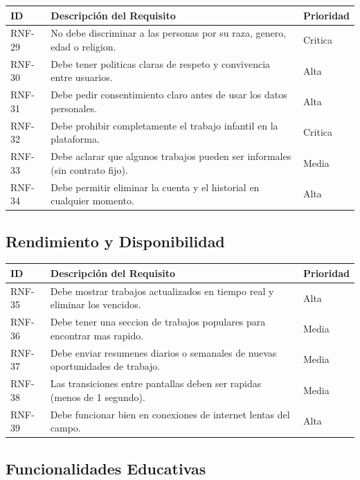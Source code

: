 \documentclass[12pt, a4paper]{article}
\begin{document}
\begin{longtable}{|p{2cm}|p{10cm}|p{2cm}|}
\hline
\textbf{ID} & \textbf{Descripción del Requisito} & \textbf{Prioridad} \\
\hline
\endhead

RNF-29 & No debe discriminar a las personas por su raza, genero, edad o religion. & Critica \\
\hline
RNF-30 & Debe tener politicas claras de respeto y convivencia entre usuarios. & Alta \\
\hline
RNF-31 & Debe pedir consentimiento claro antes de usar los datos personales. & Alta \\
\hline
RNF-32 & Debe prohibir completamente el trabajo infantil en la plataforma. & Critica \\
\hline
RNF-33 & Debe aclarar que algunos trabajos pueden ser informales (sin contrato fijo). & Media \\
\hline
RNF-34 & Debe permitir eliminar la cuenta y el historial en cualquier momento. & Alta \\
\hline
\end{longtable}

\subsection{Rendimiento y Disponibilidad}

\begin{longtable}{|p{2cm}|p{10cm}|p{2cm}|}
\hline
\textbf{ID} & \textbf{Descripción del Requisito} & \textbf{Prioridad} \\
\hline
\endhead

RNF-35 & Debe mostrar trabajos actualizados en tiempo real y eliminar los vencidos. & Alta \\
\hline
RNF-36 & Debe tener una seccion de trabajos populares para encontrar mas rapido. & Media \\
\hline
RNF-37 & Debe enviar resumenes diarios o semanales de nuevas oportunidades de trabajo. & Media \\
\hline
RNF-38 & Las transiciones entre pantallas deben ser rapidas (menos de 1 segundo). & Media \\
\hline
RNF-39 & Debe funcionar bien en conexiones de internet lentas del campo. & Alta \\
\hline
\end{longtable}

\subsection{Funcionalidades Educativas}
\end{document}
